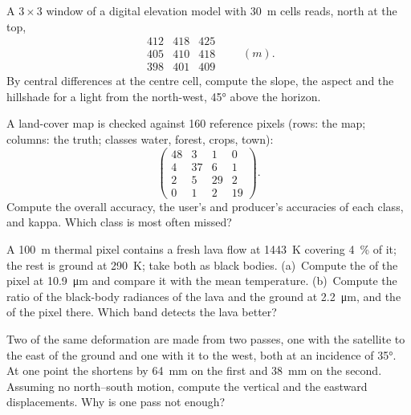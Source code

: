 \begin{exercise}[$\star\star$]\label{exo:b3:remote-sensing-gis:7}
A $3\times3$ window of a digital elevation model with \qty{30}{m} cells
reads, north at the top,
\[
\begin{matrix} 412 & 418 & 425 \\ 405 & 410 & 418 \\ 398 & 401 & 409 \end{matrix}
\qquad (\unit{m}).
\]
By central differences at the centre cell, compute the slope, the aspect
and the hillshade for a light from the north-west, \ang{45} above the
horizon.
\end{exercise}

\begin{exercise}[$\star\star$]\label{exo:b3:remote-sensing-gis:8}
A land-cover map is checked against 160 reference pixels (rows: the map;
columns: the truth; classes water, forest, crops, town):
\[
\begin{pmatrix} 48 & 3 & 1 & 0 \\ 4 & 37 & 6 & 1 \\ 2 & 5 & 29 & 2 \\ 0 & 1 & 2 & 19 \end{pmatrix} .
\]
Compute the overall accuracy, the user's and producer's accuracies of each
class, and kappa. Which class is most often missed?
\end{exercise}

\begin{exercise}[$\star\star$]\label{exo:b3:remote-sensing-gis:9}
A \qty{100}{m} thermal pixel contains a fresh lava flow at \qty{1443}{K}
covering \qty{4}{\percent} of it; the rest is ground at \qty{290}{K}; take
both as black bodies. (a)~Compute the  of the pixel
at \qty{10.9}{\micro\metre} and compare it with the mean temperature.
(b)~Compute the ratio of the black-body radiances of the lava and the
ground at \qty{2.2}{\micro\metre}, and the  of the
pixel there. Which band detects the lava better?
\end{exercise}

\begin{exercise}[$\star\star\star$]\label{exo:b3:remote-sensing-gis:10}
Two  of the same deformation are made from two passes, one
with the satellite to the east of the ground and one with it to the west,
both at an incidence of \ang{35}. At one point the
 shortens by \qty{64}{mm} on the first and \qty{38}{mm} on
the second. Assuming no north--south motion, compute the vertical and the
eastward displacements. Why is one pass not enough?
\end{exercise}


